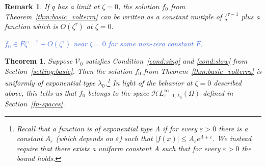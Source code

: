 \documentclass{article}
\theoremstyle{plain}
\newtheorem{thm}{Theorem}
\newtheorem{rmk}{Remark}
\newcommand{\singexp}[2]{\mathcal{H}L^\infty_{#1, #2}}
\newcommand{\hardpart}{\mathcal{V}_0}
\newcommand{\domain}{\Omega}
\begin{document}
\begin{rmk}
If $q$ has a limit at $\zeta = 0$, the solution $f_0$ from Theorem~\ref{thm:basic_volterra} can be written as a constant mutiple of $\zeta^{\tau-1}$ plus a function which is $O(\zeta^\tau)$ at $\zeta = 0$.

\textcolor{RoyalBlue}{$f_0 \in F\zeta^{\tau-1} + O(\zeta^\tau)$ near $\zeta = 0$ for some non-zero constant $F$.}
\end{rmk}
\begin{thm}\label{thm:proto-growth}
Suppose $\hardpart$ satisfies {\em Condition~\eqref{cond:sing}} and {\em \eqref{cond:slow}} from Section~\ref{setting:basic}. Then the solution $f_0$ from {\em Theorem~\ref{thm:basic_volterra}} is uniformly of exponential type $\lambda_0$.\footnote{Recall that a function is of exponential type $\Lambda$ if for every $\varepsilon>0$ there is a constant $A_\varepsilon$ (which depends on $\varepsilon$) such that $|f(x)|\leq A_\varepsilon e^{\Lambda+\varepsilon} $. We instead require that there exists a uniform constant $A$ such that for every $\varepsilon>0$ the bound holds.} In light of the behavior at $\zeta = 0$ described above, this tells us that $f_0$ belongs to the space $\singexp{\tau-1}{\lambda_0}(\domain)$ defined in Section~\ref{fn-spaces}.
\end{thm}
\end{document}
